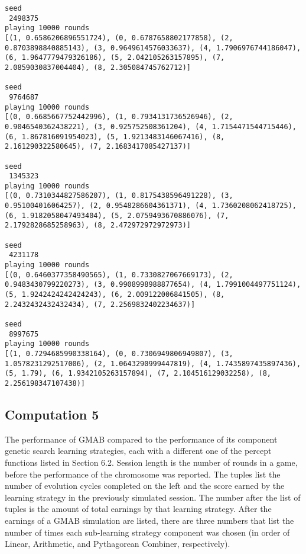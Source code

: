 \documentclass[11pt]{article}
\begin{document}
\begin{verbatim}
seed
 2498375
playing 10000 rounds
[(1, 0.6586206896551724), (0, 0.6787658802177858), (2, 0.8703898840885143), (3, 0.9649614576033637), (4, 1.7906976744186047), (6, 1.9647779479326186), (5, 2.042105263157895), (7, 2.0859030837004404), (8, 2.305084745762712)]

seed
 9764687
playing 10000 rounds
[(0, 0.6685667752442996), (1, 0.7934131736526946), (2, 0.9046540362438221), (3, 0.925752508361204), (4, 1.7154471544715446), (6, 1.867816091954023), (5, 1.9213483146067416), (8, 2.161290322580645), (7, 2.1683417085427137)]

seed
 1345323
playing 10000 rounds
[(0, 0.7310344827586207), (1, 0.8175438596491228), (3, 0.951004016064257), (2, 0.9548286604361371), (4, 1.7360208062418725), (6, 1.9182058047493404), (5, 2.0759493670886076), (7, 2.1792828685258963), (8, 2.472972972972973)]

seed
 4231178
playing 10000 rounds
[(0, 0.6460377358490565), (1, 0.7330827067669173), (2, 0.9483430799220273), (3, 0.9908998988877654), (4, 1.7991004497751124), (5, 1.9242424242424243), (6, 2.009122006841505), (8, 2.2432432432432434), (7, 2.2569832402234637)]

seed
 8997675
playing 10000 rounds
[(1, 0.7294685990338164), (0, 0.7306949806949807), (3, 1.0578231292517006), (2, 1.0643290999447819), (4, 1.7435897435897436), (5, 1.79), (6, 1.9342105263157894), (7, 2.104516129032258), (8, 2.256198347107438)]

\end{verbatim}

\subsection{Computation 5}
The performance of GMAB compared to the performance of its component genetic search learning strategies, each with a different one of the percept functions listed in Section 6.2. Session length is the number of rounds in a game, before the performance of the chromosome was reported. The tuples list the number of evolution cycles completed on the left and the score earned by the learning strategy in the previously simulated session. The number after the list of tuples is the amount of total earnings by that learning strategy. After the earnings of a GMAB simulation are listed, there are three numbers that list the number of times each sub-learning strategy component was chosen (in order of Linear, Arithmetic, and Pythagorean Combiner, respectively). 
\end{document}
